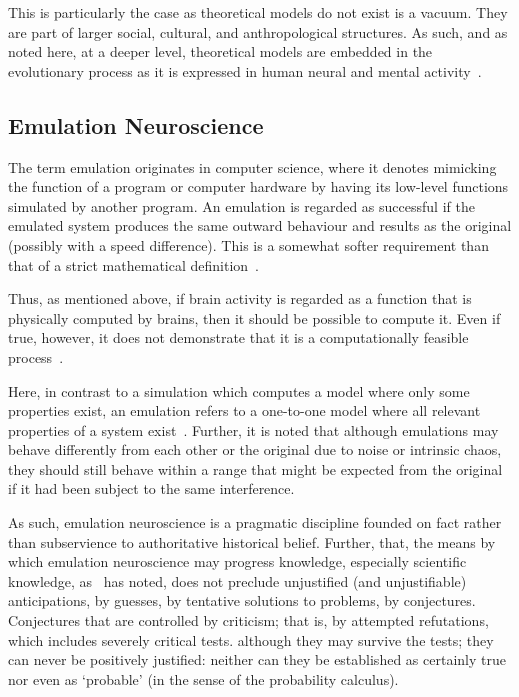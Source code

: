 \documentclass[11pt,3p,twocolumn]{JMN}
\begin{document}
This is particularly the case as theoretical models do not exist is a vacuum. They are part of larger social, cultural, and anthropological structures. As such, and as noted here, at a deeper level, theoretical models are embedded in the evolutionary process as it is expressed in human neural and mental activity~\citep{jacobson93}.

\subsection{Emulation Neuroscience}
\label{subsection:emuneuro}


The term emulation originates in computer science, where it denotes mimicking the function of a program or computer hardware by having its low-level functions simulated by another program. An emulation is regarded as successful if the emulated system produces the same outward behaviour and results as the original (possibly with a speed difference). This is a somewhat softer requirement than that of a strict mathematical definition~\citep[see, for example,][]{sandberg08}.

Thus, as mentioned above, if brain activity is regarded as a function that is physically computed by brains, then it should be possible to compute it. Even if true, however, it does not demonstrate that it is a computationally feasible process~\citep{sandberg08}.

Here, in contrast to a simulation which computes a model where only some properties exist, an emulation refers to a one-to-one model where all relevant properties of a system exist~\citep{sandberg08}. Further, it is noted that although emulations may behave differently from each other or the original due to noise or intrinsic chaos, they should still behave within a range that might be expected from the original if it had been subject to the same interference.

As such, emulation neuroscience is a pragmatic discipline founded on fact rather than subservience to authoritative historical belief. Further, that, the means by which emulation neuroscience may progress knowledge, especially scientific knowledge, as~\citet{popper62} has noted, does not preclude unjustified (and unjustifiable) anticipations, by guesses, by tentative solutions to problems, by conjectures. Conjectures that are controlled by criticism; that is, by attempted refutations, which includes severely critical tests. although they may survive the tests; they can never be positively justified: neither can they be established as certainly true nor even as `probable' (in the sense of the probability calculus).
\end{document}
